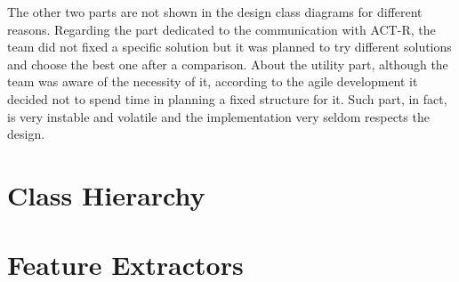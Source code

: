 	The other two parts are not shown in the design class diagrams for different reasons. 
	Regarding the part dedicated to the communication with ACT-R, the team did not fixed a specific solution but it was planned to try different solutions and choose the best one after a comparison.
	About the utility part, although the team was aware of the necessity of it, according to the agile development it decided not to spend time in planning a fixed structure for it. Such part, in fact, is very instable and volatile and the implementation very seldom respects the design.
	
	
	


	\section{Class Hierarchy}
	\section{Feature Extractors}
